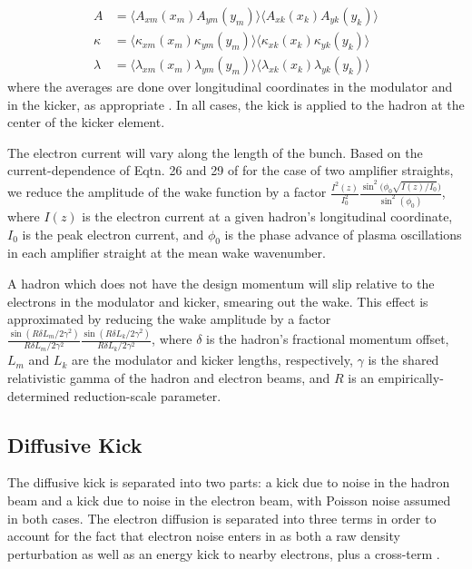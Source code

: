 \documentclass[letterpaper,11pt]{article}
\begin{document}
\begin{align}\label{eqtn:cec_wake_avg}
	A &= \langle A_{xm}(x_m) A_{ym}(y_m) \rangle \langle A_{xk}(x_k) A_{yk}(y_k)\rangle \\\nonumber
	\kappa &= \langle \kappa_{xm}(x_m) \kappa_{ym}(y_m)\rangle  \langle \kappa_{xk}(x_k) \kappa_{yk}(y_k)\rangle \\\nonumber
	\lambda &= \langle \lambda_{xm}(x_m) \lambda_{ym}(y_m)\rangle  \langle \lambda_{xk}(x_k) \lambda_{yk}(y_k)\rangle 
\end{align}
\noindent
where the averages are done over longitudinal coordinates in the modulator and in the kicker, as appropriate \cite{cite:napac2022}. In all cases, the kick is applied to the hadron at the center of the kicker element.

The electron current will vary along the length of the bunch. Based on the current-dependence of Eqtn. 26 and 29 of \cite{cite:stupakovamp} for the case of two amplifier straights, we reduce the amplitude of the wake function by a factor $\frac{I^2(z)}{I^2_0}\frac{\sin^2\big(\phi_0\sqrt{I(z)/I_0}\big)}{\sin^2(\phi_0)}$, where $I(z)$ is the electron current at a given hadron's longitudinal coordinate, $I_0$ is the peak electron current, and $\phi_0$ is the phase advance of plasma oscillations in each amplifier straight at the mean wake wavenumber.

A hadron which does not have the design momentum will slip relative to the electrons in the modulator and kicker, smearing out the wake. This effect is approximated by reducing the wake amplitude by a factor $\frac{\sin(R\delta L_m/2\gamma^2)}{R\delta L_m/2\gamma^2} \frac{\sin(R\delta L_k/2\gamma^2)}{R\delta L_k/2\gamma^2}$, where $\delta$ is the hadron's fractional momentum offset, $L_m$ and $L_k$ are the modulator and kicker lengths, respectively, $\gamma$ is the shared relativistic gamma of the hadron and electron beams, and $R$ is an empirically-determined reduction-scale parameter.

\subsection{Diffusive Kick}
The diffusive kick is separated into two parts: a kick due to noise in the hadron beam and a kick due to noise in the electron beam, with Poisson noise assumed in both cases. The electron diffusion is separated into three terms in order to account for the fact that electron noise enters in as both a raw density perturbation as well as an energy kick to nearby electrons, plus a cross-term \cite{cite:ipac2021}.
\end{document}
